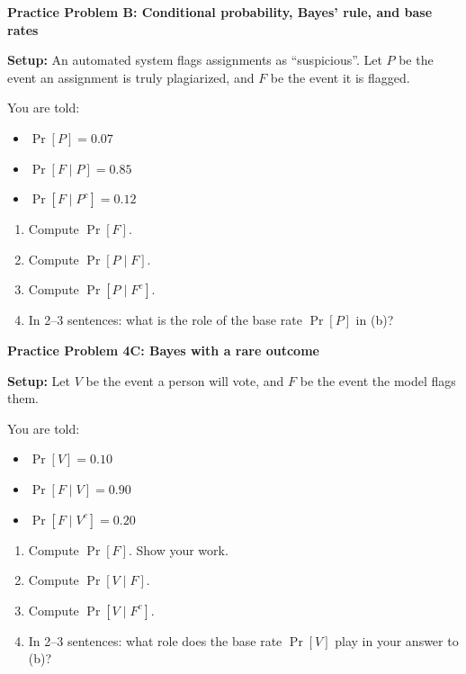 \documentclass[12pt]{article}
\begin{document}
\vspace{1em}
\noindent\textbf{Practice Problem B: Conditional probability, Bayes' rule, and base rates}

\noindent \textbf{Setup:} An automated system flags assignments as ``suspicious''.
Let $P$ be the event an assignment is truly plagiarized, and $F$ be the event it is flagged.

You are told:
\begin{itemize}
  \item $\Pr[P]=0.07$
  \item $\Pr[F\mid P]=0.85$
  \item $\Pr[F\mid P^c]=0.12$
\end{itemize}

\begin{enumerate}[label=\arabic*\alph*)]
  \item Compute $\Pr[F]$.
  \item Compute $\Pr[P\mid F]$.
  \item Compute $\Pr[P\mid F^c]$.
  \item In 2--3 sentences: what is the role of the base rate $\Pr[P]$ in (b)?
\end{enumerate}

\vspace{1em}

\noindent\textbf{Practice Problem 4C: Bayes with a rare outcome}

\noindent \textbf{Setup:} Let $V$ be the event a person will vote, and $F$ be the event the model flags them.

\noindent You are told:
\begin{itemize}
  \item $\Pr[V]=0.10$
  \item $\Pr[F\mid V]=0.90$
  \item $\Pr[F\mid V^c]=0.20$
\end{itemize}

\begin{enumerate}[label=\arabic*\alph*)]
  \item Compute $\Pr[F]$. Show your work.
  \item Compute $\Pr[V\mid F]$.
  \item Compute $\Pr[V\mid F^c]$.
  \item In 2--3 sentences: what role does the base rate $\Pr[V]$ play in your answer to (b)?
\end{enumerate}

\vspace{1em}
\end{document}
